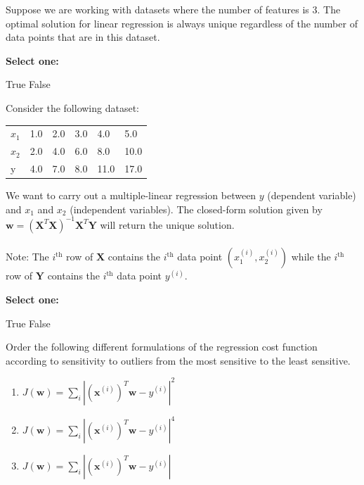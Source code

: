 \documentclass[11pt,addpoints,answers]{exam}
\numberwithin{equation}{section} %
\numberwithin{figure}{section} %
\numberwithin{table}{section} %
\newcommand{\wv}{\mathbf{w}}
\newcommand{\xv}{\mathbf{x}}
\newcommand{\Xv}{\mathbf{X}}
\newcommand{\Yv}{\mathbf{Y}}
\begin{document}
\begin{questions}
    
\question[2] Suppose we are working with datasets where the number of features is 3. The optimal solution for linear regression is always unique regardless of the number of data points that are in this dataset.
    
    \textbf{Select one:}
    \begin{checkboxes}
        \choice True
        \choice False
    \end{checkboxes}
    
    
    \newpage
    \question[1] Consider the following dataset:
        \begin{table}[H]
    \centering
        \begin{tabular}{llllll}
        $x_1$ & 1.0 & 2.0 & 3.0 & 4.0 & 5.0 \\
        $x_2$ & 2.0 & 4.0 & 6.0 & 8.0 & 10.0 \\
        y & 4.0 & 7.0 & 8.0 & 11.0 & 17.0
        \end{tabular}
    \end{table}
   We want to carry out a multiple-linear regression between $y$ (dependent variable) and $x_1$ and $x_2$ (independent variables). The closed-form solution given by $\wv = \left(\Xv^T\Xv\right)^{-1}\Xv^T \Yv$ will return the unique solution. 
    \\~\\
    Note: The $i^{\text{th}}$ row of $\Xv$ contains the $i^{\text{th}}$ data point $(x_1^{(i)}, x_2^{(i)})$ while the $i^{\text{th}}$ row of $\Yv$ contains the $i^{\text{th}}$ data point $y^{(i)}$. 
    
        \textbf{Select one:}
    \begin{checkboxes}
        \choice True
        \choice False
    \end{checkboxes}
    

    
    \question[3] Order the following different formulations of the regression cost function according to sensitivity to outliers from the most sensitive to the least sensitive. 
\begin{enumerate}
    \item $J(\mathbf{w}) = \sum\limits_{i} | (\xv^{(i)})^T\mathbf{w}-y^{(i)}|^2$
    \item $J(\mathbf{w}) = \sum\limits_{i} | (\xv^{(i)})^T\mathbf{w}-y^{(i)}|^4$
    \item $J(\mathbf{w}) = \sum\limits_{i} | (\xv^{(i)})^T\mathbf{w}-y^{(i)}|$
\end{enumerate}


\end{questions}
\end{document}
